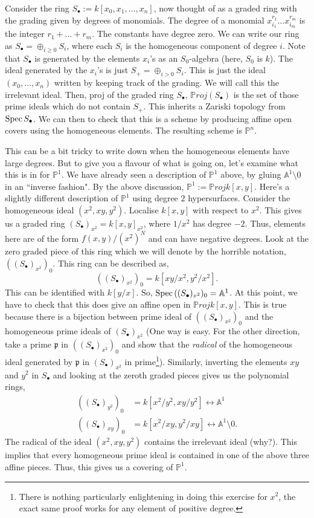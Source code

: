 \documentclass[11pt]{amsart}
\newcommand{\Proj}{{\P roj}}
\newcommand{\Spec}{{\rm Spec \,}}
\newcommand{\A}{{\mathbb A}}
\renewcommand{\P}{{\mathbb P}}
\theoremstyle{definition}
\begin{document}
Consider the ring $S_{\bullet}:=k[x_0,x_1,\ldots,x_n]$, now thought of as a graded ring with the grading given by degrees of monomials. The degree of a monomial $x^{r_1}_{i_1}\ldots x^{r_m}_{i_m}$ is the integer $r_1+\ldots +r_m$. The constants have degree zero. We can write our ring as $S_{\bullet}=\oplus_{i\geq 0}S_i$, where each $S_i$ is the homogeneous component of degree $i$. Note that $S_{\bullet}$ is generated by the elements $x_i$'s as an $S_0$-algebra (here, $S_0$ is $k$). The ideal generated by the $x_i$'s is just $S_{+}=\oplus_{i>0}S_i$. This is just the ideal $(x_0,\ldots,x_n)$ written by keeping track of the grading. We will call this the irrelevant ideal. Then, proj of the graded ring $S_{\bullet}$, $\Proj(S_{\bullet})$ is the set of those  prime ideals which do not contain $S_+$. This inherits a Zariski topology from $\Spec S_{\bullet}$. We can then to check that this is a scheme by producing affine open covers using the homogeneous elements. The resulting scheme is $\P^n$.

This can be a bit tricky to write down when the homogeneous elements have large degrees. But to give you a flavour of what is going on, let's examine what this is in for $\P^1$. We have already seen a description of $\P^1$ above, by gluing $\A^1\setminus 0$ in an ``inverse fashion".  By the above discussion, $\P^1:=\Proj k[x,y]$. Here's a slightly different description of $\P^1$ using degree $2$ hypersurfaces. Consider the homogeneous ideal $(x^2,xy,y^2)$. Localise $k[x,y]$ with respect to $x^2$. This gives us a graded ring $(S_{\bullet})_{x^2}=k[x,y]_{x^2}$, where $1/x^2$ has degree $-2$. Thus, elements here are of the form $f(x,y)/(x^{2})^N$ and can have negative degrees. Look at the zero graded piece of this ring which we will denote by the horrible notation, $((S_{\bullet})_{x^2})_0$. This ring can be described as,
\[((S_{\bullet})_{x^2})_0=k[xy/x^2,y^2/x^2].\]
This can be identified with $k[y/x]$. So, $\Spec ((S_{\bullet})_{x^2})_0=\A^1$. At this point, we have to check that this does give an affine open in $\Proj k[x,y]$. This is true because there is a bijection between prime ideal of $((S_{\bullet})_{x^2})_0$ and the homogeneous prime ideals of $(S_{\bullet})_{x^2}$ (One way is easy. For the other direction, take a prime $\mathfrak{p}$ in $((S_{\bullet})_{x^2})_0$ and show that the \textit{radical} of the homogeneous ideal generated by $\mathfrak{p}$ in $(S_{\bullet})_{x^2}$ in prime\footnote{There is nothing particularly enlightening in doing this exercise for $x^2$, the exact same proof works for any element of positive degree.}). Similarly, inverting the elements $xy$ and $y^2$ in $S_{\bullet}$ and looking at the zeroth graded pieces gives us the polynomial rings,
\begin{align*}
((S_{\bullet})_{y^2})_0 &=k[x^2/y^2,xy/y^2]\longleftrightarrow \A^1\\
((S_{\bullet})_{xy})_0 &=k[x^2/xy,y^2/xy]\longleftrightarrow \A^1\setminus 0.
\end{align*}
The radical of the ideal $(x^2,xy,y^2)$ contains the irrelevant ideal (why?). This implies that every homogeneous prime ideal is contained in one of the above three affine pieces. Thus, this gives us a covering of $\P^1$.
\end{document}
